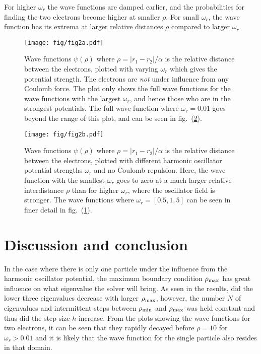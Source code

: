 \documentclass[a4paper,11pt]{article}
\begin{document}
For higher $\omega_r$ the wave functions are damped earlier, and the probabilities for finding the two electrons become higher at smaller $\rho$. For small $\omega_r$, the wave function has its extrema at larger relative distances $\rho$ compared to larger $\omega_r$.

\begin{figure}[htb]
    \centering
    \texttt{[image: fig/fig2a.pdf]}
    \caption{Wave functions $\psi(\rho)$ where $\rho = |r_1 - r_2|/\alpha$ is the relative distance between the electrons, plotted with varying $\omega_r$ which gives the potential strength. The electrons are \textit{not} under influence from any Coulomb force. The plot only shows the full wave functions for the wave functions with the largest $\omega_r$, and hence those who are in the strongest potentials. The full wave function where $\omega_r = 0.01$ goes beyond the range of this plot, and can be seen in fig.~(\ref{fig:2b}).}
    \label{fig:2a}
\end{figure}

\begin{figure}[htb]
    \centering
    \texttt{[image: fig/fig2b.pdf]}
    \caption{Wave functions $\psi(\rho)$ where $\rho = |r_1 - r_2|/\alpha$ is the relative distance between the electrons, plotted with different harmonic oscillator potential strengths $\omega_r$ and no Coulomb repulsion. Here, the wave function with the smallest $\omega_r$ goes to zero at a much larger relative interdistance $\rho$ than for higher $\omega_r$, where the oscillator field is stronger. The wave functions where $\omega_r = [0.5, 1, 5]$ can be seen in finer detail in fig.~(\ref{fig:2a}). }
    \label{fig:2b}
\end{figure}

\section{Discussion and conclusion}
In the case where there is only one particle under the influence from the harmonic oscillator potential, the maximum boundary condition $\rho_{\rm max}$ has great influence on what eigenvalue the solver will bring. As seen in the results, did the lower three eigenvalues decrease with larger $\rho_{\rm max}$, however, the number $N$ of eigenvalues and intermittent steps between $\rho_{\rm min}$ and $\rho_{\rm max}$ was held constant and thus did the step size $h$ increase. From the plots showing the wave functions for two electrons, it can be seen that they rapidly decayed before $\rho = 10$ for $\omega_r > 0.01$ and it is likely that the wave function for the single particle also resides in that domain.
\end{document}
